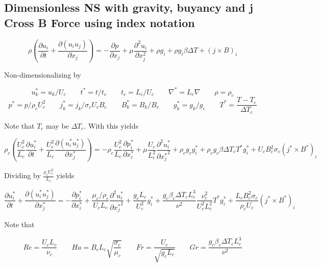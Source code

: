 \documentclass[11pt]{article}
\newcommand{\PD}{\partial}
\begin{document}
\subsection{Dimensionless NS with gravity, buyancy and j Cross B Force using index notation}
\begin{equation}
	\rho 
	\left( 
	\frac{\PD u_i}{\PD t} + 
	\frac{\PD (u_i u_j)}{\PD x_j}
	\right) 
	= 
	- \frac{\PD p}{\PD x_j}
	+ \mu \frac{\PD^2 u_i}{\PD x_j^2}
	+ \rho g_i
	+ \rho g_i \beta \Delta T
	+ (j \times B)_i
\end{equation}

Non-dimensionalizing by

\begin{equation}
	u_k^* = u_k/U_c \qquad
	t^* = t/t_c \qquad
	t_c = L_c/U_c \qquad
	\nabla^* = L_c \nabla \qquad
	\rho = \rho_c
\end{equation}
\begin{equation}
	p^* = p/\rho_c U_c^2 \qquad
	j_k^* = j_k/ \sigma_c U_c B_c \qquad
	B_k^* = B_k/B_c \qquad
	g_k^* = g_k/g_c \qquad
	T^* = \frac{T - T_c}{\Delta T_c}
\end{equation}

Note that $T_c$ may be $\Delta T_c$. With this yields

\begin{equation}
	\rho_c 
	\left( 
	\frac{U_c^2}{L_c} 
	\frac{\PD u_i^*}{\PD t} + 
	\frac{U_c^2}{L_c} 
	\frac{\PD (u_i^* u_j^*)}{\PD x_j^*}
	\right) 
	= 
	- \rho_c \frac{U_c^2}{L_c} 
	\frac{\PD p_i^*}{\PD x_i^*}
	+ \mu \frac{U_c}{L_c^2} 
	\frac{\PD^2 u_i^*}{\PD {x_j^*}^2}
	+ \rho_c g_c g_i^* 
	+ \rho_c g_c \beta \Delta T_c T^*g_i^*
	+ U_c B_c^2 \sigma_c 
	(j^* \times B^*)_i
\end{equation}

Dividing by $\frac{\rho_c U_c^2}{L_c}$ yields

\begin{equation}
	\frac{\PD u_i^*}{\PD t} + 
	\frac{\PD (u_i^* u_j^*)}{\PD x_j^*}
	= 
	- \frac{\PD p_i^*}{\PD x_i^*}
	+ \frac{\mu_c/\rho_c}{U_c L_c} 
	\frac{\PD^2 u_i^*}{\PD {x_j^*}^2}
	+ \frac{g_c L_c}{U_c^2}
	g_i^*
	+ \frac{g_c \beta_c \Delta T_c L_c^3}{\nu^2} \frac{\nu_c^2}{U_c^2 L_c^2} T^*g_i^*
	+ \frac{L_c B_c^2 \sigma_c}{\rho_c U_c}
	(j^* \times B^*)_i
\end{equation}

Note that

\begin{equation}
	Re = \frac{U_c L_c}{\nu_c} \qquad
	Ha = B_c L_c \sqrt{\frac{\sigma_c}{\mu_c}} \qquad
	Fr = \frac{U_c}{\sqrt{g_c L_c}} \qquad
	Gr = \frac{g_c \beta_c \Delta T_c L_c^3}{\nu^2}
\end{equation}
\end{document}
